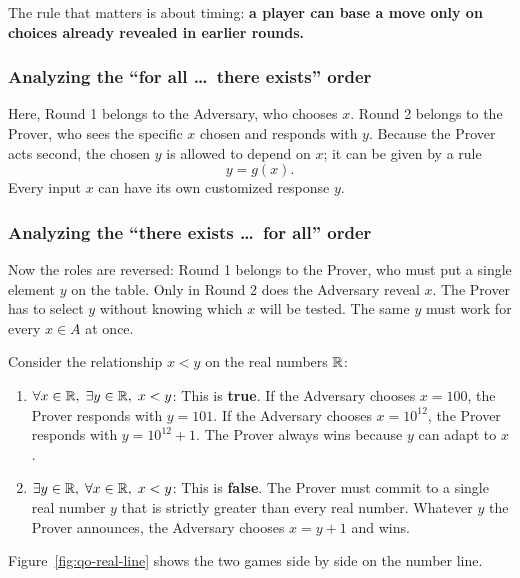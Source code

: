 The rule that matters is about timing: \textbf{a player can base a move only on choices already revealed in earlier rounds.}

\subsubsection{Analyzing the ``for all \dots\ there exists'' order}
Here, Round 1 belongs to the Adversary, who chooses $x$. Round 2 belongs to the Prover, who sees the specific $x$ chosen and responds with $y$.
Because the Prover acts second, the chosen $y$ is allowed to depend on $x$; it can be given by a rule
\[
y = g(x).
\]
Every input $x$ can have its own customized response $y$.

\subsubsection{Analyzing the ``there exists \dots\ for all'' order}
Now the roles are reversed: Round 1 belongs to the Prover, who must put a single element $y$ on the table. Only in Round 2 does the Adversary reveal $x$.
The Prover has to select $y$ without knowing which $x$ will be tested. The same $y$ must work for every $x \in A$ at once.

\begin{example}
Consider the relationship $x < y$ on the real numbers $\mathbb{R}$:
\begin{enumerate}
\item $\forall x \in \mathbb{R}, \; \exists y \in \mathbb{R}, \; x < y$: This is \textbf{true}. If the Adversary chooses $x = 100$, the Prover responds with $y = 101$. If the Adversary chooses $x = 10^{12}$, the Prover responds with $y = 10^{12} + 1$. The Prover always wins because $y$ can adapt to $x$.
\item $\exists y \in \mathbb{R}, \; \forall x \in \mathbb{R}, \; x < y$: This is \textbf{false}. The Prover must commit to a single real number $y$ that is strictly greater than every real number. Whatever $y$ the Prover announces, the Adversary chooses $x = y + 1$ and wins.
\end{enumerate}
\end{example}

Figure~\ref{fig:qo-real-line} shows the two games side by side on the number line.

